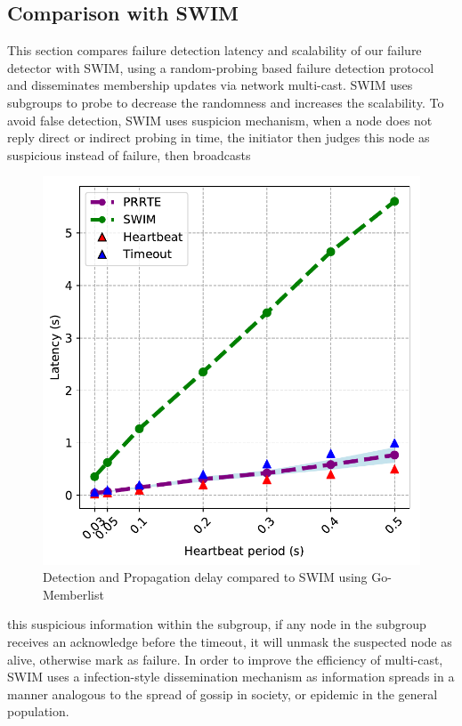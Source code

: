 \documentclass[sigconf]{acmart}
\begin{document}
\subsection{Comparison with SWIM}
This section compares failure detection latency and scalability of our failure detector with SWIM\cite{Abhinandan02}, using a random-probing based failure detection protocol and disseminates membership updates via network multi-cast. SWIM uses subgroups to probe to decrease the randomness and increases the scalability. To avoid false detection, SWIM uses suspicion mechanism, when a node does not reply direct or indirect probing in time, the initiator then judges this node as suspicious instead of failure, then broadcasts
\begin{figure}[h]
  \centering
  \includegraphics[width=\linewidth]{HB_prrte_swim.pdf}
  \caption{Detection and Propagation delay compared to SWIM using Go-Memberlist}
\end{figure}
this suspicious information within the subgroup, if any node in the subgroup receives an acknowledge before the timeout, it will unmask the suspected node as alive, otherwise mark as failure. In order to improve the efficiency of multi-cast, SWIM uses a infection-style dissemination mechanism as information spreads in a manner analogous to the spread of gossip in society, or epidemic in the general population.
\end{document}

